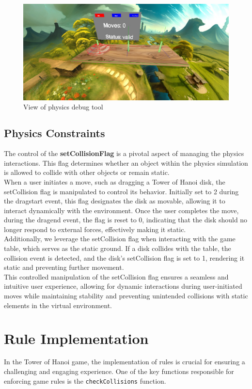 \documentclass{article}
\begin{document}
\begin{figure}[h]
    \centering
    \includegraphics[width = \textwidth]{img/physics-debug.jpeg}
    \caption{View of physics debug tool}
    \label{fig:physics-debug}
\end{figure}

\subsection{Physics Constraints}
The control of the \textbf{setCollisionFlag} is a pivotal aspect of managing the physics interactions. This flag determines whether an object within the physics simulation is allowed to collide with other objects or remain static.\\
When a user initiates a move, such as dragging a Tower of Hanoi disk, the setCollision flag is manipulated to control its behavior. Initially set to 2 during the dragstart event, this flag designates the disk as movable, allowing it to interact dynamically with the environment. Once the user completes the move, during the dragend event, the flag is reset to 0, indicating that the disk should no longer respond to external forces, effectively making it static.\\
Additionally, we leverage the setCollision flag when interacting with the game table, which serves as the static ground. If a disk collides with the table, the collision event is detected, and the disk's setCollision flag is set to 1, rendering it static and preventing further movement.\\
This controlled manipulation of the setCollision flag ensures a seamless and intuitive user experience, allowing for dynamic interactions during user-initiated moves while maintaining stability and preventing unintended collisions with static elements in the virtual environment.

\section{Rule Implementation}
In the Tower of Hanoi game, the implementation of rules is crucial for ensuring a challenging and engaging experience. One of the key functions responsible for enforcing game rules is the \texttt{checkCollisions} function.
\end{document}
